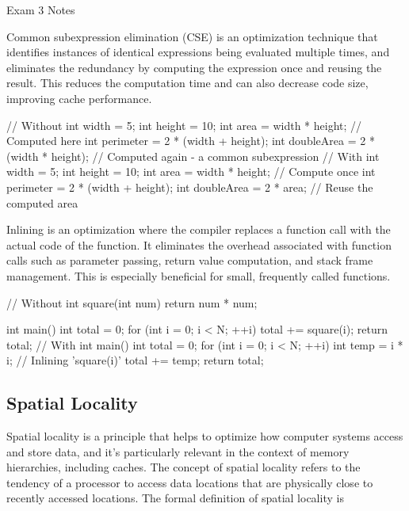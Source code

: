 \begin{examnotes}{Exam 3 Notes}
    \begin{highlight}
        Common subexpression elimination (CSE) is an optimization technique that identifies instances of identical expressions being evaluated multiple times, and eliminates the redundancy by computing 
        the expression once and reusing the result. This reduces the computation time and can also decrease code size, improving cache performance.

    \begin{code}[C++]
    // Without
    int width = 5;
    int height = 10;
    int area = width * height; // Computed here
    int perimeter = 2 * (width + height);
    int doubleArea = 2 * (width * height); // Computed again - a common subexpression
    // With
    int width = 5;
    int height = 10;
    int area = width * height; // Compute once
    int perimeter = 2 * (width + height);
    int doubleArea = 2 * area; // Reuse the computed area    
    \end{code}
    \end{highlight}

    \begin{highlight}[Inlining]
        Inlining is an optimization where the compiler replaces a function call with the actual code of the function. It eliminates the overhead associated with function calls such as parameter passing, 
        return value computation, and stack frame management. This is especially beneficial for small, frequently called functions.

    \begin{code}[C++]
    // Without
    int square(int num) {
        return num * num;
    }
    
    int main() {
        int total = 0;
        for (int i = 0; i < N; ++i) {
            total += square(i);
        }
        return total;
    }
    // With
    int main() {
        int total = 0;
        for (int i = 0; i < N; ++i) {
            int temp = i * i; // Inlining 'square(i)'
            total += temp;
        }
        return total;
    }    
    \end{code}
    \end{highlight}

    \subsection*{Spatial Locality}

    Spatial locality is a principle that helps to optimize how computer systems access and store data, and it's particularly relevant in the context of memory hierarchies, including caches. The concept 
    of spatial locality refers to the tendency of a processor to access data locations that are physically close to recently accessed locations. The formal definition of spatial locality is


\end{examnotes}

